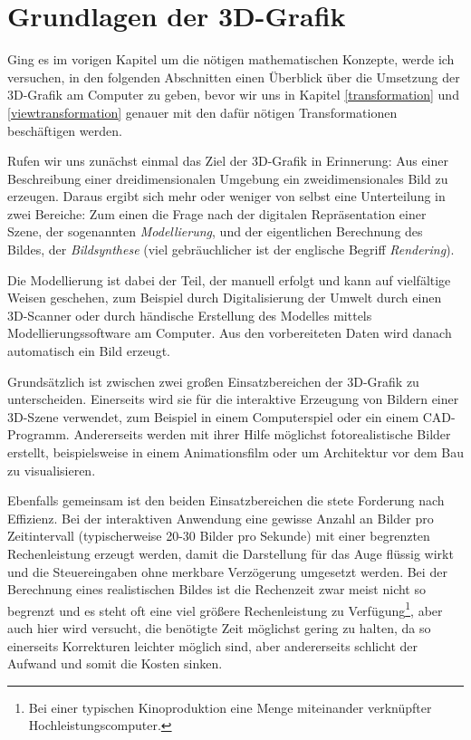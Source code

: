 \chapter{Grundlagen der 3D-Grafik}
Ging es im vorigen Kapitel um die nötigen mathematischen Konzepte, werde ich versuchen, in den folgenden Abschnitten einen Überblick über die Umsetzung der 3D-Grafik am Computer zu geben, bevor wir uns in Kapitel \ref{transformation} und \ref{viewtransformation} genauer mit den dafür nötigen Transformationen beschäftigen werden.

Rufen wir uns zunächst einmal das Ziel der 3D-Grafik in Erinnerung: Aus einer Beschreibung einer dreidimensionalen Umgebung ein zweidimensionales Bild zu erzeugen. Daraus ergibt sich mehr oder weniger von selbst eine Unterteilung in zwei Bereiche: Zum einen die Frage nach der digitalen Repräsentation einer Szene, der sogenannten \emph{Modellierung}, und der eigentlichen Berechnung des Bildes, der \emph{Bildsynthese} (viel gebräuchlicher ist der englische Begriff \emph{Rendering}).

Die Modellierung ist dabei der Teil, der manuell erfolgt und kann auf vielfältige Weisen geschehen, zum Beispiel durch Digitalisierung der Umwelt durch einen 3D-Scanner oder durch händische Erstellung des Modelles mittels Modellierungssoftware am Computer. Aus den vorbereiteten Daten wird danach automatisch ein Bild erzeugt.

Grundsätzlich ist zwischen zwei großen Einsatzbereichen der 3D-Grafik zu unterscheiden. Einerseits wird sie für die interaktive Erzeugung von Bildern einer 3D-Szene verwendet, zum Beispiel in einem Computerspiel oder ein einem CAD-Programm. Andererseits werden mit ihrer Hilfe möglichst fotorealistische Bilder erstellt, beispielsweise in einem Animationsfilm oder um Architektur vor dem Bau zu visualisieren.

Ebenfalls gemeinsam ist den beiden Einsatzbereichen die stete Forderung nach Effizienz. Bei der interaktiven Anwendung eine gewisse Anzahl an Bilder pro Zeitintervall (typischerweise 20-30 Bilder pro Sekunde) mit einer begrenzten Rechenleistung erzeugt werden, damit die Darstellung für das Auge flüssig wirkt und die Steuereingaben ohne merkbare Verzögerung umgesetzt werden. Bei der Berechnung eines realistischen Bildes ist die Rechenzeit zwar meist nicht so begrenzt und es steht oft eine viel größere Rechenleistung zu Verfügung\footnote{Bei einer typischen Kinoproduktion eine Menge miteinander verknüpfter Hochleistungscomputer.}, aber auch hier wird versucht, die benötigte Zeit möglichst gering zu halten, da so einerseits Korrekturen leichter möglich sind, aber andererseits schlicht der Aufwand und somit die Kosten sinken.

